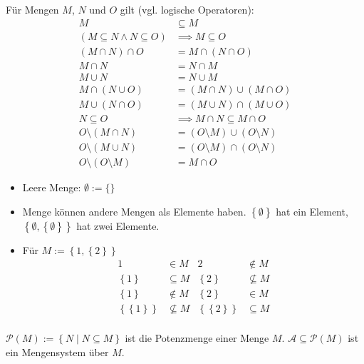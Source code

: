 \begin{theorem}
  Für Mengen $M$, $N$ und $O$ gilt (vgl. logische Operatoren):
  \begin{align*}
    M &\subseteq M\\
    (M \subseteq N \wedge N \subseteq O) &\implies M \subseteq O\\
    (M \cap N) \cap O &= M \cap (N \cap O) \\
    M \cap N &= N \cap M\\
    M \cup N &= N \cup M\\
    M \cap (N \cup O) &= (M \cap N) \cup (M \cap O)\\
    M \cup (N \cap O) &= (M \cup N) \cap (M \cup O)\\
    N \subseteq O &\implies M \cap N \subseteq M \cap O \\
    O \setminus (M \cap N) &= (O \setminus M) \cup (O \setminus N) \\
    O \setminus (M \cup N) &= (O \setminus M) \cap (O \setminus N) \\
    O \setminus (O \setminus M) &= M \cap O
  \end{align*}
\end{theorem}

\begin{remark}
  \begin{itemize}
  \item Leere Menge: $\emptyset := \{\}$
  \item Menge können andere Mengen als Elemente haben. $\left\{ \emptyset \right\}$ hat ein Element, $\left\{ \emptyset, \left\{ \emptyset \right\} \right\}$ hat zwei Elemente.
  \item Für $M:= \left\{ 1, \left\{ 2 \right\} \right\}$
    \begin{align*}
      1 &\in M & 2 &\not\in M \\
      \left\{ 1 \right\} &\subseteq M & \left\{ 2 \right\} &\not\subseteq M \\
      \left\{ 1 \right\} &\not\in M & \left\{ 2 \right\} &\in M \\
      \left\{ \left\{ 1 \right\} \right\} &\not\subseteq M & \left\{ \left\{ 2 \right\} \right\} &\subseteq M \\
    \end{align*}
  \end{itemize}
\end{remark}

\begin{definition}
  $\mathscr{P}(M) := \left\{ N \middle| N \subseteq M \right\}$ ist die Potenzmenge einer Menge $M$. $\mathscr{A} \subseteq \mathscr{P}(M)$ ist ein Mengensystem über $M$.
\end{definition}

